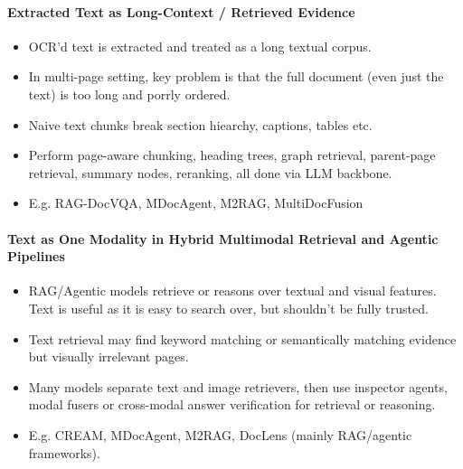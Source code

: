 \documentclass[11pt]{article}
\begin{document}
\paragraph{Extracted Text as Long-Context / Retrieved Evidence}
\begin{itemize}
    \item OCR'd text is extracted and treated as a long textual corpus. 
    \item In multi-page setting, key problem is that the full document (even just the text) is too long and porrly ordered.
    \item Naive text chunks break section hiearchy, captions, tables etc.
    \item Perform page-aware chunking, heading trees, graph retrieval, parent-page retrieval, summary nodes, reranking, all done via LLM backbone.
    \item E.g. RAG-DocVQA, MDocAgent, M2RAG, MultiDocFusion
\end{itemize}

\paragraph{Text as One Modality in Hybrid Multimodal Retrieval and Agentic Pipelines}
\begin{itemize}
    \item RAG/Agentic models retrieve or reasons over textual and visual features. Text is useful as it is easy to search over, but shouldn't be fully trusted.
    \item Text retrieval may find keyword matching or semantically matching evidence but visually irrelevant pages.
    \item Many models separate text and image retrievers, then use inspector agents, modal fusers or cross-modal answer verification for retrieval or reasoning.
    \item E.g. CREAM, MDocAgent, M2RAG, DocLens (mainly RAG/agentic frameworks).
\end{itemize}
\end{document}
